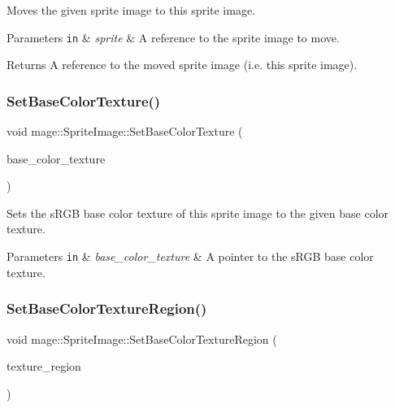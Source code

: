 Moves the given sprite image to this sprite image.


\begin{DoxyParams}[1]{Parameters}
\mbox{\tt in}  & {\em sprite} & A reference to the sprite image to move. \\
\hline
\end{DoxyParams}
\begin{DoxyReturn}{Returns}
A reference to the moved sprite image (i.\+e. this sprite image). 
\end{DoxyReturn}
\hypertarget{classmage_1_1_sprite_image_a9fb3a39de1350e58b4019b541337ca13}{}\label{classmage_1_1_sprite_image_a9fb3a39de1350e58b4019b541337ca13} 
\subsubsection{\texorpdfstring{Set\+Base\+Color\+Texture()}{SetBaseColorTexture()}}
{\footnotesize\ttfamily void mage\+::\+Sprite\+Image\+::\+Set\+Base\+Color\+Texture (\begin{DoxyParamCaption}\item[{\hyperlink{namespacemage_a1e01ae66713838a7a67d30e44c67703e}{Shared\+Ptr}$<$ const \hyperlink{classmage_1_1_texture}{Texture} $>$}]{base\+\_\+color\+\_\+texture }\end{DoxyParamCaption})\hspace{0.3cm}{\ttfamily [noexcept]}}

Sets the s\+R\+GB base color texture of this sprite image to the given base color texture.


\begin{DoxyParams}[1]{Parameters}
\mbox{\tt in}  & {\em base\+\_\+color\+\_\+texture} & A pointer to the s\+R\+GB base color texture. \\
\hline
\end{DoxyParams}
\hypertarget{classmage_1_1_sprite_image_aa68e416669d05cf777c564b118b50fe5}{}\label{classmage_1_1_sprite_image_aa68e416669d05cf777c564b118b50fe5} 
\subsubsection{\texorpdfstring{Set\+Base\+Color\+Texture\+Region()}{SetBaseColorTextureRegion()}}
{\footnotesize\ttfamily void mage\+::\+Sprite\+Image\+::\+Set\+Base\+Color\+Texture\+Region (\begin{DoxyParamCaption}\item[{R\+E\+CT}]{texture\+\_\+region }\end{DoxyParamCaption})\hspace{0.3cm}{\ttfamily [noexcept]}}


